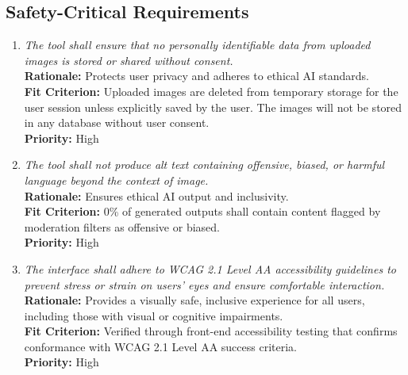 \documentclass[12pt]{article}
\begin{document}
\subsection{Safety-Critical Requirements}
\begin{enumerate}[label=PR-SCR \arabic*., wide=0pt, leftmargin=*]
\item \emph{The tool shall ensure that no personally identifiable data from uploaded images is stored or shared without consent.}\\[2mm] 
    {\bf Rationale:} Protects user privacy and adheres to ethical AI standards.\\
    {\bf Fit Criterion:} Uploaded images are deleted from temporary storage for the user session unless explicitly saved by the user. The images will not be stored in any database without user consent.\\
    {\bf Priority:} High

\item \emph{The tool shall not produce alt text containing offensive, biased, or harmful language beyond the context of image.}\\[2mm] 
    {\bf Rationale:} Ensures ethical AI output and inclusivity.\\
    {\bf Fit Criterion:} 0\% of generated outputs shall contain content flagged by moderation filters as offensive or biased.\\
    {\bf Priority:} High

\item \emph{The interface shall adhere to WCAG 2.1 Level AA accessibility guidelines to prevent stress or strain on users’ eyes and ensure comfortable interaction.}\\[2mm] 
    {\bf Rationale:} Provides a visually safe, inclusive experience for all users, including those with visual or cognitive impairments.\\
    {\bf Fit Criterion:} Verified through front-end accessibility testing that confirms conformance with WCAG 2.1 Level AA success criteria.\\
    {\bf Priority:} High
\end{enumerate}
\end{document}
